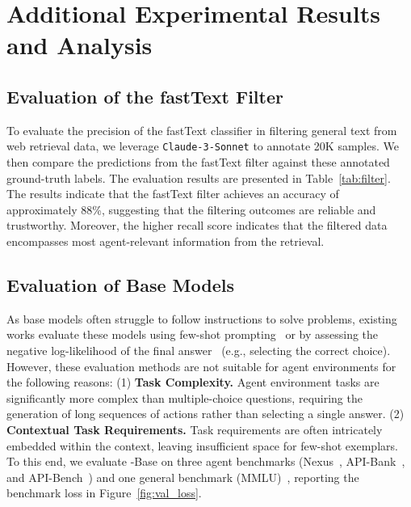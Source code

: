 \section{Additional Experimental Results and Analysis}
\label{app:exp}

\subsection{Evaluation of the fastText Filter}
To evaluate the precision of the fastText classifier in filtering general text from web retrieval data, we leverage \texttt{Claude-3-Sonnet} to annotate 20K samples. We then compare the predictions from the fastText filter against these annotated ground-truth labels. The evaluation results are presented in Table~\ref{tab:filter}.
The results indicate that the fastText filter achieves an accuracy of approximately 88\%, suggesting that the filtering outcomes are reliable and trustworthy. Moreover, the higher recall score indicates that the filtered data encompasses most agent-relevant information from the retrieval.



\subsection{Evaluation of Base Models}
As base models often struggle to follow instructions to solve problems, existing works evaluate these models using few-shot prompting~\cite{wei2022chain, shao2024deepseekmath} or by assessing the negative log-likelihood of the final answer~\cite{dubey2024llama} (e.g., selecting the correct choice). However, these evaluation methods are not suitable for agent environments for the following reasons: (1) \textbf{Task Complexity.} Agent environment tasks are significantly more complex than multiple-choice questions, requiring the generation of long sequences of actions rather than selecting a single answer. (2) \textbf{Contextual Task Requirements.} Task requirements are often intricately embedded within the context, leaving insufficient space for few-shot exemplars.
To this end, we evaluate \method-Base on three agent benchmarks (Nexus~\cite{srinivasan2023nexusraven}, API-Bank~\cite{li2023api}, and API-Bench~\cite{patil2023gorilla}) and one general benchmark (MMLU)~\cite{hendrycks2020measuring}, reporting the benchmark loss in Figure~\ref{fig:val_loss}. 


